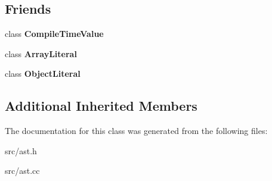 \subsection*{Friends}
\begin{DoxyCompactItemize}
\item 
\hypertarget{classv8_1_1internal_1_1_materialized_literal_a8b5ce5782a366f51fd3ac3a2a7bbc54f}{}class {\bfseries Compile\+Time\+Value}\label{classv8_1_1internal_1_1_materialized_literal_a8b5ce5782a366f51fd3ac3a2a7bbc54f}

\item 
\hypertarget{classv8_1_1internal_1_1_materialized_literal_a13d34cc74ec8e17e3891f53066cbcd4e}{}class {\bfseries Array\+Literal}\label{classv8_1_1internal_1_1_materialized_literal_a13d34cc74ec8e17e3891f53066cbcd4e}

\item 
\hypertarget{classv8_1_1internal_1_1_materialized_literal_af53f5f0c57f02b72b3211be078d03c7d}{}class {\bfseries Object\+Literal}\label{classv8_1_1internal_1_1_materialized_literal_af53f5f0c57f02b72b3211be078d03c7d}

\end{DoxyCompactItemize}
\subsection*{Additional Inherited Members}


The documentation for this class was generated from the following files\+:\begin{DoxyCompactItemize}
\item 
src/ast.\+h\item 
src/ast.\+cc\end{DoxyCompactItemize}

